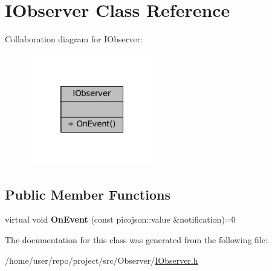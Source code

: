 \hypertarget{classIObserver}{}\section{I\+Observer Class Reference}
\label{classIObserver}


Collaboration diagram for I\+Observer\+:\nopagebreak
\begin{figure}[H]
\begin{center}
\leavevmode
\includegraphics[width=157pt]{classIObserver__coll__graph}
\end{center}
\end{figure}
\subsection*{Public Member Functions}
\begin{DoxyCompactItemize}
\item 
\mbox{\label{classIObserver_a4f6addae98c6ac8ffc7c7ec668cdb010}} 
virtual void {\bfseries On\+Event} (const picojson\+::value \&notification)=0
\end{DoxyCompactItemize}


The documentation for this class was generated from the following file\+:\begin{DoxyCompactItemize}
\item 
/home/user/repo/project/src/\+Observer/\hyperlink{IObserver_8h}{I\+Observer.\+h}\end{DoxyCompactItemize}
